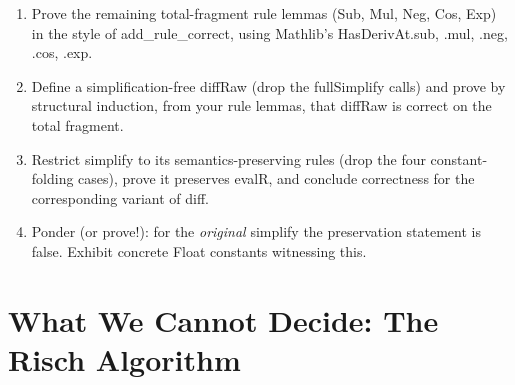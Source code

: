 \documentclass[12pt, openany]{book}
\theoremstyle{plain}
\theoremstyle{definition}
\theoremstyle{remark}
\newcommand{\li}[1]{{\ttfamily\small\color{tealaccent}#1}}
\begin{document}
\begin{exbox}[title={Extended Exercise: the full correctness theorem}]
\begin{enumerate}
  \item Prove the remaining total-fragment rule lemmas (\li{Sub}, \li{Mul},
        \li{Neg}, \li{Cos}, \li{Exp}) in the style of
        \li{add\_rule\_correct}, using Mathlib's \li{HasDerivAt.sub},
        \li{.mul}, \li{.neg}, \li{.cos}, \li{.exp}.
  \item Define a simplification-free \li{diffRaw} (drop the
        \li{fullSimplify} calls) and prove by structural induction, from your
        rule lemmas, that \li{diffRaw} is correct on the total fragment.
  \item Restrict \li{simplify} to its semantics-preserving rules (drop the
        four constant-folding cases), prove it preserves \li{evalR}, and
        conclude correctness for the corresponding variant of \li{diff}.
  \item Ponder (or prove!): for the \emph{original} \li{simplify} the
        preservation statement is false.  Exhibit concrete Float constants
        witnessing this.
\end{enumerate}
\end{exbox}
\color{black}

\section{What We Cannot Decide: The Risch Algorithm}
\end{document}
